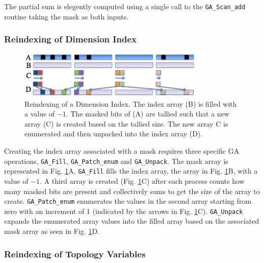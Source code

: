 
The partial sum is elegently computed using a single call to the
\verb+GA_Scan_add+ routine taking the mask as both inputs.

\subsubsection{Reindexing of Dimension Index}

\begin{figure}[!t]
\center
\includegraphics[width=3.5in]{images/unpack}
\caption{Reindexing of a Dimension Index.  The index array (B) is filled with
a value of $-1$.  The masked bits of (A) are tallied such that a new array (C)
is created based on the tallied size.  The new array C is enumerated and then
unpacked into the index array (D).}
\label{fig:unpack}
\end{figure}

Creating the index array associated with a mask requires three specific GA
operations, \verb=GA_Fill=, \verb=GA_Patch_enum= and \verb=GA_Unpack=.  The
mask array is represented in Fig. \ref{fig:unpack}A.  \verb=GA_Fill= fills the
index array, the array in Fig. \ref{fig:unpack}B, with a value of $-1$.  A
third array is created (Fig. \ref{fig:unpack}C) after each process counts how
many masked bits are present and collectively sums to get the size of the
array to create.  \verb=GA_Patch_enum= enumerates the values in the second
array starting from zero with an increment of 1 (indicated by the arrows in
Fig. \ref{fig:unpack}C).  \verb=GA_Unpack= expands the enumerated array values
into the filled array based on the associated mask array as seen in Fig.
\ref{fig:unpack}D.

\subsubsection{Reindexing of Topology Variables}

